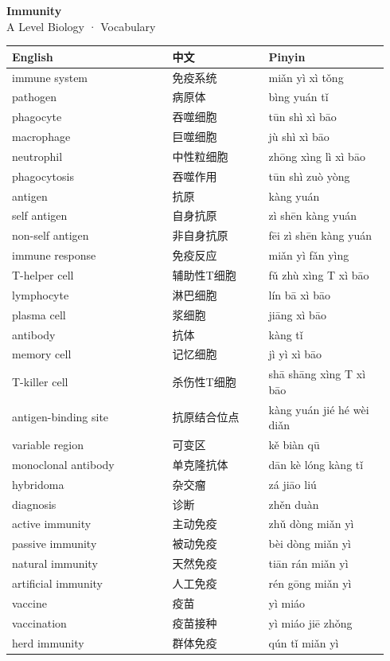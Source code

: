 \documentclass[11pt]{article}
\begin{document}
\begin{center}
  {\LARGE\bfseries Immunity}\\[0.35em]
  {\large A Level Biology · Vocabulary}
\end{center}
\vspace{0.6em}

\begin{longtable}{@{}p{0.40\linewidth}p{0.24\linewidth}p{0.30\linewidth}@{}}
\toprule
\textbf{English} & \textbf{中文} & \textbf{Pinyin} \\
\midrule
\endhead
\bottomrule
\endlastfoot
immune system & 免疫系统 & miǎn yì xì tǒng \\
pathogen & 病原体 & bìng yuán tǐ \\
phagocyte & 吞噬细胞 & tūn shì xì bāo \\
macrophage & 巨噬细胞 & jù shì xì bāo \\
neutrophil & 中性粒细胞 & zhōng xìng lì xì bāo \\
phagocytosis & 吞噬作用 & tūn shì zuò yòng \\
antigen & 抗原 & kàng yuán \\
self antigen & 自身抗原 & zì shēn kàng yuán \\
non-self antigen & 非自身抗原 & fēi zì shēn kàng yuán \\
immune response & 免疫反应 & miǎn yì fǎn yìng \\
T-helper cell & 辅助性T细胞 & fǔ zhù xìng T xì bāo \\
lymphocyte & 淋巴细胞 & lín bā xì bāo \\
plasma cell & 浆细胞 & jiāng xì bāo \\
antibody & 抗体 & kàng tǐ \\
memory cell & 记忆细胞 & jì yì xì bāo \\
T-killer cell & 杀伤性T细胞 & shā shāng xìng T xì bāo \\
antigen-binding site & 抗原结合位点 & kàng yuán jié hé wèi diǎn \\
variable region & 可变区 & kě biàn qū \\
monoclonal antibody & 单克隆抗体 & dān kè lóng kàng tǐ \\
hybridoma & 杂交瘤 & zá jiāo liú \\
diagnosis & 诊断 & zhěn duàn \\
active immunity & 主动免疫 & zhǔ dòng miǎn yì \\
passive immunity & 被动免疫 & bèi dòng miǎn yì \\
natural immunity & 天然免疫 & tiān rán miǎn yì \\
artificial immunity & 人工免疫 & rén gōng miǎn yì \\
vaccine & 疫苗 & yì miáo \\
vaccination & 疫苗接种 & yì miáo jiē zhǒng \\
herd immunity & 群体免疫 & qún tǐ miǎn yì \\
\end{longtable}
\end{document}
